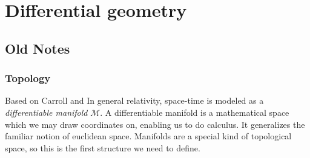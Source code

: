 \section{Differential geometry}

\label{section: differential geometry}







\subsection{Old Notes}


\subsubsection*{Topology} 
Based on Carroll and
In general relativity, space-time is modeled as a \emph{differentiable manifold} $\mathcal{M}$.
A differentiable manifold is a mathematical space which we may draw coordinates on, enabling us to do calculus.
It generalizes the familiar notion of euclidean space. 
Manifolds are a special kind of topological space, so this is the first structure we need to define.

